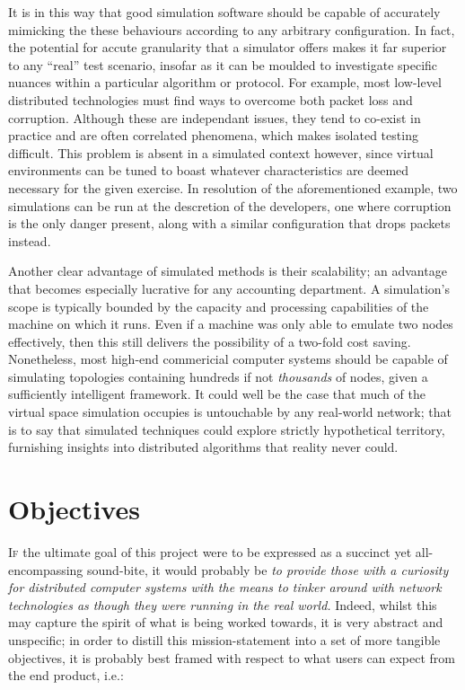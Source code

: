 It is in this way that good simulation software should be capable of accurately mimicking the these behaviours
according to any arbitrary configuration. In fact, the potential for accute granularity that a simulator offers makes
it far superior to any ``real'' test scenario, insofar as it can be moulded to investigate specific nuances within a
particular algorithm or protocol. For example, most low-level distributed technologies must find ways to overcome
both packet loss and corruption. Although these are independant issues, they tend to co-exist in practice and are
often correlated phenomena, which makes isolated testing difficult. This problem is absent in a simulated context
however, since virtual environments can be tuned to boast whatever characteristics are deemed necessary for
the given exercise. In resolution of the aforementioned example, two simulations can be run at the descretion of the
developers, one where corruption is the only danger present, along with a similar configuration that drops packets
instead.

Another clear advantage of simulated methods is their scalability; an advantage that becomes especially lucrative for
any accounting department. A simulation's scope is typically bounded by the capacity and processing capabilities of
the machine on which it runs. Even if a machine was only able to emulate two nodes effectively, then this still
delivers the possibility of a two-fold cost saving. Nonetheless, most high-end commericial computer systems should be
capable of simulating topologies containing hundreds if not \emph{thousands} of nodes, given a sufficiently
intelligent framework. It could well be the case that much of the virtual space simulation occupies is untouchable by
any real-world network; that is to say that simulated techniques could explore strictly hypothetical territory,
furnishing insights into distributed algorithms that reality never could.


\section{Objectives}\label{section:objectives}

\lettrine{I}{f} the ultimate goal of this project were to be expressed as a succinct yet all-encompassing sound-bite,
it would probably be \emph{to provide those with a curiosity for distributed computer systems with the means to tinker
around with network technologies as though they were running in the real world.} Indeed, whilst this may capture the
spirit of what is being worked towards, it is very abstract and unspecific; in order to distill this
mission-statement into a set of more tangible objectives, it is probably best framed with respect to what users can
expect from the end product, i.e.:

